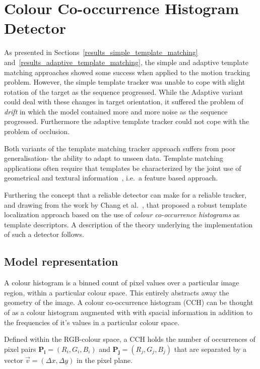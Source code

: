 
\section{Colour Co-occurrence Histogram Detector}\label{theoretical_framework_ch}
As presented in Sections~\ref{results_simple_template_matching} and~\ref{results_adaptive_template_matching}, 
the simple and adaptive template matching
approaches showed some success when applied to the motion
tracking problem. However, the simple template tracker was unable to cope with
slight rotation of the target as the sequence progressed.
While the Adaptive variant could deal with these changes in target
orientation, it suffered the problem of \textit{drift} in which the model contained
more and more noise as the sequence progressed.
Furthermore the adaptive template tracker could not cope with the problem of
occlusion.

Both variants of the template matching tracker approach suffers from poor generalisation- the
ability to adapt to unseen data. Template matching applications often require
that templates be characterized by the joint use of geometrical and textural
information~\cite{Brunelli}, i.e.\ a feature based approach.

Furthering the concept that a reliable detector can make for a reliable
tracker, and drawing from the work by Chang et al.~\cite{Chang1999}, that proposed a
robust template localization approach based on the use of \textit{colour co-occurrence
histograms} as template descriptors. A description of the theory underlying the
implementation of such a detector follows.

\subsection{Model representation}
A colour histogram is a binned count of pixel values over a particular image
region, within a particular colour space. This entirely abstracts away the geometry of
the image.
A colour co-occurrence histogram (CCH) can be thought of as a colour histogram
augmented with with spacial information in addition to the frequencies of it's
values in a particular colour
space.

Defined within the RGB-colour space, a CCH holds the number of occurrences of
pixel pairs $\mathbf{P_i}=(R_i,G_i,B_i)$ and $\mathbf{P_j}=(R_j,G_j,B_j)$ that
are separated by a vector $\vec{v}=(\Delta{x}, \Delta{y})$ in the pixel plane.

